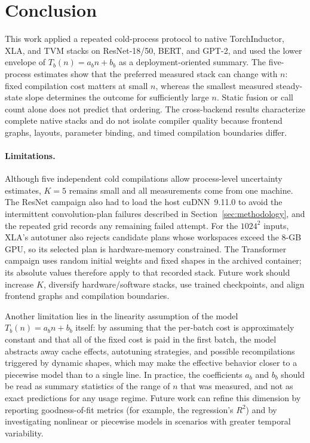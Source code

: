 \documentclass[sigconf]{acmart}
\begin{document}
\section{Conclusion}

This work applied a repeated cold-process protocol to native TorchInductor, XLA, and TVM stacks on ResNet-18/50, BERT, and GPT-2, and used the lower envelope of \(T_b(n)=a_b n+b_b\) as a deployment-oriented summary. The five-process estimates show that the preferred measured stack can change with \(n\): fixed compilation cost matters at small \(n\), whereas the smallest measured steady-state slope determines the outcome for sufficiently large \(n\). Static fusion or call count alone does not predict that ordering. The cross-backend results characterize complete native stacks and do not isolate compiler quality because frontend graphs, layouts, parameter binding, and timed compilation boundaries differ.

\paragraph{Limitations.}
Although five independent cold compilations allow process-level uncertainty estimates, \(K=5\) remains small and all measurements come from one machine. The ResNet campaign also had to load the host cuDNN~9.11.0 to avoid the intermittent convolution-plan failures described in Section~\ref{sec:methodology}, and the repeated grid records any remaining failed attempt. For the \(1024^2\) inputs, XLA's autotuner also rejects candidate plans whose workspaces exceed the 8-GB GPU, so its selected plan is hardware-memory constrained. The Transformer campaign uses random initial weights and fixed shapes in the archived container; its absolute values therefore apply to that recorded stack. Future work should increase \(K\), diversify hardware/software stacks, use trained checkpoints, and align frontend graphs and compilation boundaries.

Another limitation lies in the linearity assumption of the model \(T_b(n)=a_b n + b_b\) itself: by assuming that the per-batch cost is approximately constant and that all of the fixed cost is paid in the first batch, the model abstracts away cache effects, autotuning strategies, and possible recompilations triggered by dynamic shapes, which may make the effective behavior closer to a piecewise model than to a single line. In practice, the coefficients \(a_b\) and \(b_b\) should be read as summary statistics of the range of \(n\) that was measured, and not as exact predictions for any usage regime. Future work can refine this dimension by reporting goodness-of-fit metrics (for example, the regression's \(R^2\)) and by investigating nonlinear or piecewise models in scenarios with greater temporal variability.
\end{document}
